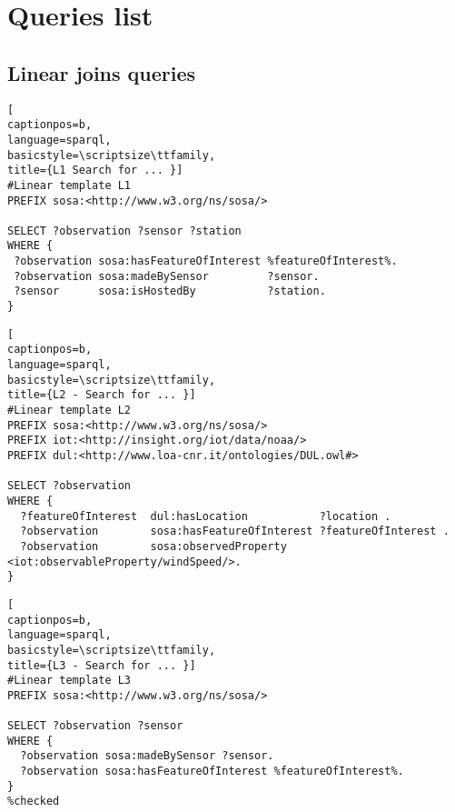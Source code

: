 \chapter{Queries list}
\label{app:A}

\section{Linear joins queries}

\begin{lstlisting}[
captionpos=b, 
language=sparql,
basicstyle=\scriptsize\ttfamily,
title={L1 Search for ... }]
#Linear template L1
PREFIX sosa:<http://www.w3.org/ns/sosa/>

SELECT ?observation ?sensor ?station 
WHERE {
 ?observation sosa:hasFeatureOfInterest %featureOfInterest%.
 ?observation sosa:madeBySensor         ?sensor.
 ?sensor      sosa:isHostedBy           ?station.
}
\end{lstlisting}
\begin{lstlisting}[
captionpos=b, 
language=sparql,
basicstyle=\scriptsize\ttfamily,
title={L2 - Search for ... }]
#Linear template L2
PREFIX sosa:<http://www.w3.org/ns/sosa/>
PREFIX iot:<http://insight.org/iot/data/noaa/>
PREFIX dul:<http://www.loa-cnr.it/ontologies/DUL.owl#>

SELECT ?observation 
WHERE {
  ?featureOfInterest  dul:hasLocation           ?location .
  ?observation        sosa:hasFeatureOfInterest ?featureOfInterest .
  ?observation        sosa:observedProperty     <iot:observableProperty/windSpeed/>.
}
\end{lstlisting}
\begin{lstlisting}[
captionpos=b, 
language=sparql,
basicstyle=\scriptsize\ttfamily,
title={L3 - Search for ... }]
#Linear template L3
PREFIX sosa:<http://www.w3.org/ns/sosa/>

SELECT ?observation ?sensor 
WHERE {
  ?observation sosa:madeBySensor ?sensor.
  ?observation sosa:hasFeatureOfInterest %featureOfInterest%.
}
%checked
\end{lstlisting}

